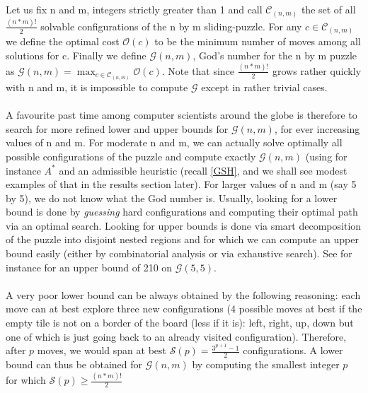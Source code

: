 
Let us fix n and m, integers strictly greater than 1 and call $\mathcal{C}_{(n, m)}$ the set of all $\frac{(n * m)!}{2}$ solvable configurations of the n by m sliding-puzzle. For any $c \in \mathcal{C}_{(n, m)}$ we define the optimal cost $\mathcal{O}(c)$ to be the minimum number of moves among all solutions for c. Finally we define $\mathcal{G}(n, m)$, God's number for the n by m puzzle as  $\mathcal{G}(n, m) = \max_{c \in \mathcal{C}_{(n, m)}} \mathcal{O}(c)$. Note that since $\frac{(n * m)!}{2}$ grows rather quickly with n and m, it is impossible to compute $\mathcal{G}$ except in rather trivial cases.
\\
\\
A favourite past time among computer scientists around the globe is therefore to search for more refined lower and upper bounds for $\mathcal{G}(n, m)$, for ever increasing values of n and m. For moderate n and m, we can actually solve optimally all possible configurations of the puzzle and compute exactly $\mathcal{G}(n, m)$  (using for instance $A^{*}$ and an admissible heuristic (recall \ref{GSH}, and we shall see modest examples of that in the results section later). For larger values of n and m (say 5 by 5), we do not know what the God number is. Usually, looking for a lower bound is done by \textit{guessing} hard configurations and computing their optimal path via an optimal search. Looking for upper bounds is done via smart decomposition of the puzzle into disjoint nested regions and for which we can compute an upper bound easily (either by combinatorial analysis or via exhaustive search). See for instance \cite{KarlemoOstergard} for an upper bound of 210 on $\mathcal{G}(5, 5)$.
\\
\\
A very poor lower bound can be always obtained by the following reasoning: each move can at best explore three new configurations (4 possible moves at best if the empty tile is not on a border of the board (less if it is): left, right, up, down but one of which is just going back to an already visited configuration). Therefore, after $p$ moves, we would span at best $\mathcal{S}(p) = \frac{3^{p+1} - 1}{2}$ configurations. A lower bound can thus be obtained for $\mathcal{G}(n, m)$ by computing the smallest integer $p$ for which $\mathcal{S}(p) \ge \frac{(n * m)!}{2}$





